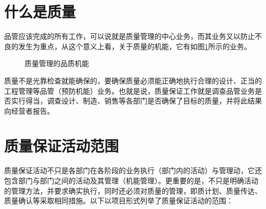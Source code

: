 \section {什么是质量}

    品管应该完成的所有工作，可以说就是质量管理的中心业务，而其业务又以防止不良的发生为重点，从这个意义上看，关于质量的机能，它有如图\ref{fig:qcMech}所示的业务。

    \begin{figure}[h]
        \centering
        \caption{质量管理的品质机能}    \label{fig:qcMech}
    \end{figure}

    质量不是光靠检查就能确保的，要确保质量必须能正确地执行合理的设计、正当的工程管理等品管（预防机能）业务。也就是说，质量保证工作就是调查品管业务是否实行得当，调查设计、制造、销售等各部门是否确保了目标的质量，并将此结果向经营者报告。

\section {质量保证活动范围}

  质量保证活动不只是各部门在各阶段的业务执行（部门内的活动）与管理动，它还包含部门与部门之间的活动及其管理（机能管理）。更重要的是，不只是明确活动的管理方法，并要求确实执行，同时还必须对质量的管理，即质计划、质量传达、质量确认等采取相同措施。以下以项目形式列举了质量保证活动的范围：

